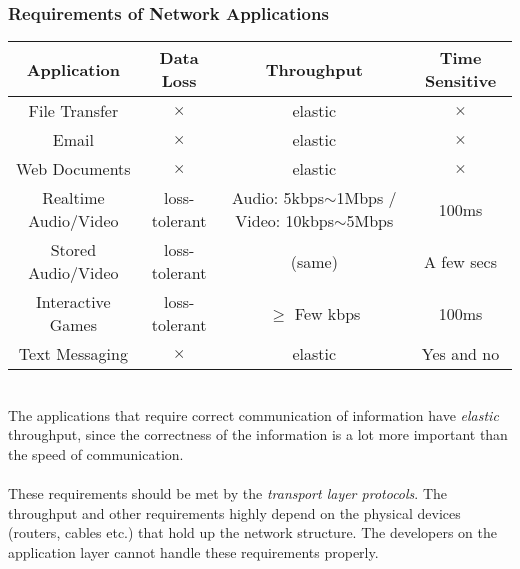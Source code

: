 \subsubsection{Requirements of Network Applications}
\begin{center}
\begin{tabular}{c|c|c|c}
	\textbf{Application} & \textbf{Data Loss} & \textbf{Throughput} & \textbf{Time Sensitive} \\ \hline
	File Transfer & $\times$ & elastic & $\times$\\
	Email & $\times$ & elastic & $\times$\\
	Web Documents & $\times$ & elastic & $\times$\\
	Realtime Audio/Video & loss-tolerant & Audio: 5kbps$\sim$1Mbps / Video: 10kbps$\sim$5Mbps& 100ms\\
	Stored Audio/Video & loss-tolerant & (same) & A few secs\\
	Interactive Games & loss-tolerant & $\geq$ Few kbps & 100ms\\
	Text Messaging & $\times$ & elastic & Yes and no\\\hline
\end{tabular}
\end{center}~\\
The applications that require correct communication of information have \textit{elastic} throughput, since the correctness of the information is a lot more important than the speed of communication.\\
\\
These requirements should be met by the \textit{transport layer protocols}. The throughput and other requirements highly depend on the physical devices (routers, cables etc.) that hold up the network structure. The developers on the application layer cannot handle these requirements properly.

